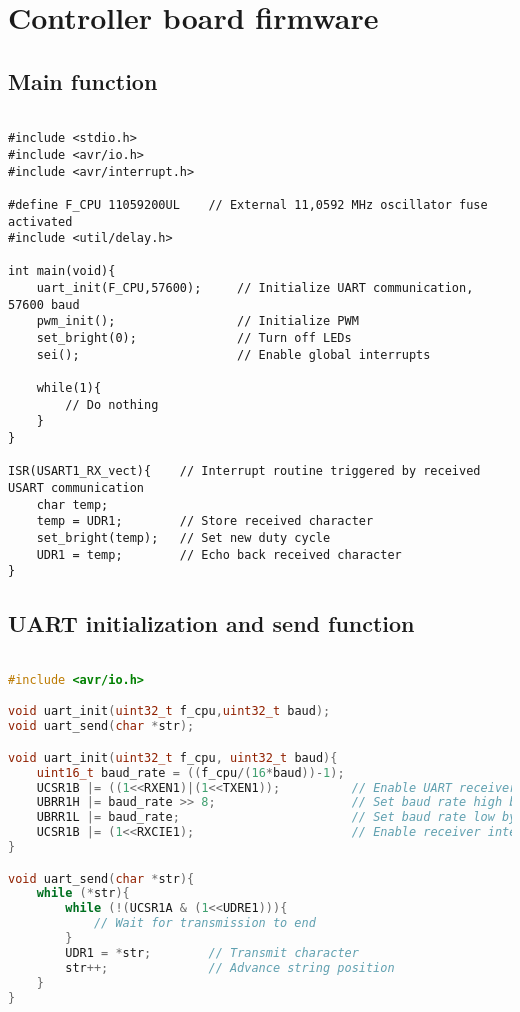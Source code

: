 \chapter{Controller board firmware} \label{cha:ERM_APX1}



\section{Main function} \label{cha:ERM_APX1_1}

\begin{lstlisting}

#include <stdio.h>
#include <avr/io.h>
#include <avr/interrupt.h>

#define F_CPU 11059200UL    // External 11,0592 MHz oscillator fuse activated
#include <util/delay.h>

int main(void){
    uart_init(F_CPU,57600);     // Initialize UART communication, 57600 baud
    pwm_init();                 // Initialize PWM
    set_bright(0);              // Turn off LEDs
    sei();                      // Enable global interrupts
    
    while(1){
        // Do nothing
    }
}

ISR(USART1_RX_vect){    // Interrupt routine triggered by received USART communication
    char temp;
    temp = UDR1;        // Store received character
    set_bright(temp);   // Set new duty cycle
    UDR1 = temp;        // Echo back received character
}

\end{lstlisting}
\clearpage


\section{UART initialization and send function} \label{cha:ERM_APX1_2}

\begin{lstlisting}[language=C++]

#include <avr/io.h>	

void uart_init(uint32_t f_cpu,uint32_t baud);
void uart_send(char *str);

void uart_init(uint32_t f_cpu, uint32_t baud){
    uint16_t baud_rate = ((f_cpu/(16*baud))-1);
    UCSR1B |= ((1<<RXEN1)|(1<<TXEN1));          // Enable UART receiver and transmitter
    UBRR1H |= baud_rate >> 8;                   // Set baud rate high byte
    UBRR1L |= baud_rate;                        // Set baud rate low byte
    UCSR1B |= (1<<RXCIE1);                      // Enable receiver interrupt
}

void uart_send(char *str){
    while (*str){
        while (!(UCSR1A & (1<<UDRE1))){
            // Wait for transmission to end
        }
        UDR1 = *str;        // Transmit character
        str++;              // Advance string position
    }
}

\end{lstlisting}
\clearpage


